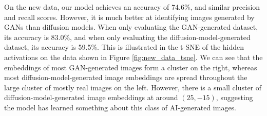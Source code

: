 \documentclass{article} %
\begin{document}
On the new data, our model achieves an accuracy of 74.6\%, and similar precision and recall scores. However, it is much better at identifying images generated by GANs than diffusion models. When only evaluating the GAN-generated dataset, its accuracy is 83.0\%, and when only evaluating the diffusion-model-generated dataset, its accuracy is 59.5\%. This is illustrated in the t-SNE of the hidden activations on the data shown in Figure \ref{fig:new_data_tsne}. We can see that the embeddings of most GAN-generated images form a cluster on the right, whereas most diffusion-model-generated image embeddings are spread throughout the large cluster of mostly real images on the left. However, there is a small cluster of diffusion-model-generated image embeddings at around $(25, -15)$, suggesting the model has learned something about this class of AI-generated images.
\end{document}
